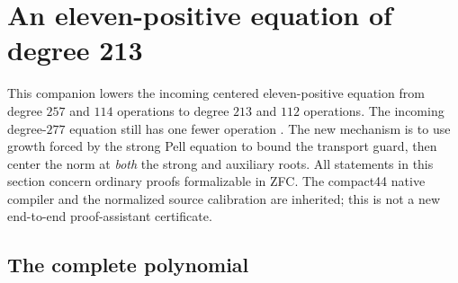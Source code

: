 \section{An eleven-positive equation of degree 213}
\label{sec:strong-pell-budget}

This companion lowers the incoming centered eleven-positive equation from
degree $257$ and $114$ operations to degree $213$ and $112$ operations.
The incoming degree-$277$ equation still has one fewer operation
\cite{joint}.  The new mechanism is to use growth forced by the strong
Pell equation to bound the transport guard, then center the norm at
\emph{both} the strong and auxiliary roots.  All statements in this
section concern ordinary proofs formalizable in ZFC.  The compact44
native compiler and the normalized source calibration are inherited;
this is not a new end-to-end proof-assistant certificate.

\subsection{The complete polynomial}

